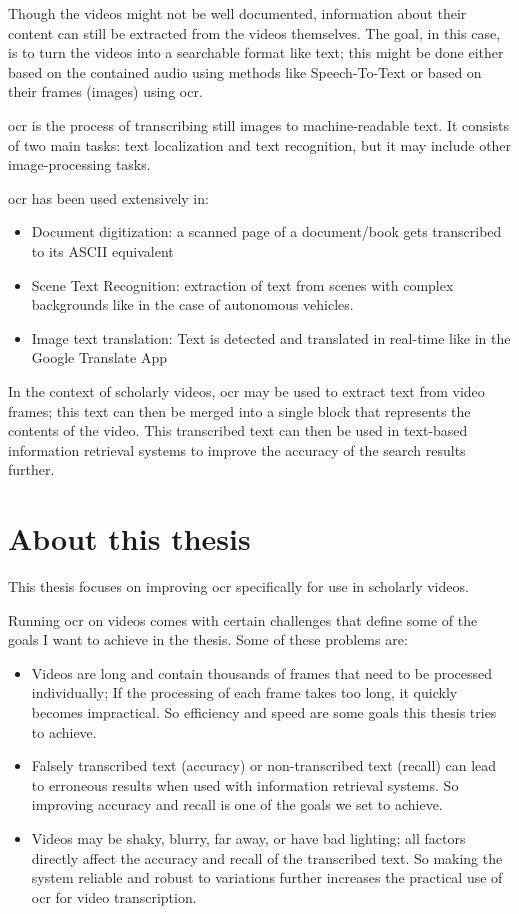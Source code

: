 Though the videos might not be well documented, information about their content can still be extracted from the videos themselves. The goal, in this case, is to turn the videos into a searchable format like text; this might be done either based on the contained audio using methods like Speech-To-Text or based on their frames (images) using \gls{ocr}.

\gls{ocr} is the process of transcribing still images to machine-readable text. It consists of two main tasks: text localization and text recognition, but it may include other image-processing tasks.


\gls{ocr} has been used extensively in:
\begin{itemize}
    \item Document digitization: a scanned page of a document/book gets transcribed to its ASCII equivalent
    \item Scene Text Recognition: extraction of text from scenes with complex backgrounds like in the case of autonomous vehicles.
    \item Image text translation: Text is detected and translated in real-time like in the Google Translate App
\end{itemize}

In the context of scholarly videos, \gls{ocr} may be used to extract text from video frames; this text can then be merged into a single block that represents the contents of the video.
This transcribed text can then be used in text-based information retrieval systems to improve the accuracy of the search results further.

\section{About this thesis}

This thesis focuses on improving \gls{ocr} specifically for use in scholarly videos.

Running \gls{ocr} on videos comes with certain challenges that define some of the goals I want to achieve in the thesis. Some of these problems are:
\begin{itemize}
    \item Videos are long and contain thousands of frames that need to be processed individually; If the processing of each frame takes too long, it quickly becomes impractical.
    So efficiency and speed are some goals this thesis tries to achieve.
    \item Falsely transcribed text (accuracy) or non-transcribed text (recall) can lead to erroneous results when used with information retrieval systems. So improving accuracy and recall is one of the goals we set to achieve.
    \item Videos may be shaky, blurry, far away, or have bad lighting; all factors directly affect the accuracy and recall of the transcribed text. So making the system reliable and robust to variations further increases the practical use of \gls{ocr} for video transcription.
\end{itemize}